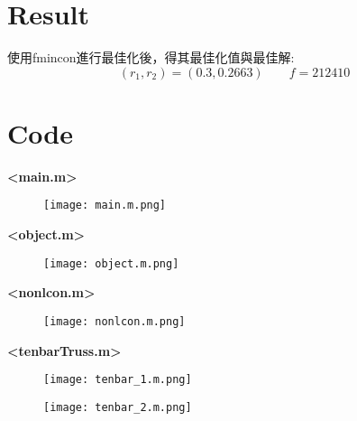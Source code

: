 \documentclass[a4paper]{article}
\begin{document}
\section{Result}
使用fmincon進行最佳化後，得其最佳化值與最佳解:
\[(r_{1},r_{2}) = (0.3,0.2663)\qquad f = 212410\]

\section{Code}
\textbf{<main.m>}
    \begin{figure}[H]
    \centering \texttt{[image: main.m.png]}
    \end{figure}
    
\textbf{<object.m>}
    \begin{figure}[H]
    \centering \texttt{[image: object.m.png]}
    \end{figure}
    
\textbf{<nonlcon.m>}
    \begin{figure}[H]
    \centering \texttt{[image: nonlcon.m.png]}
    \end{figure}
    
\textbf{<tenbarTruss.m>}
    \begin{figure}[H]
    \centering \texttt{[image: tenbar\_1.m.png]}
    \end{figure}
    \begin{figure}[H]
    \centering \texttt{[image: tenbar\_2.m.png]}
    \end{figure}
\end{document}
